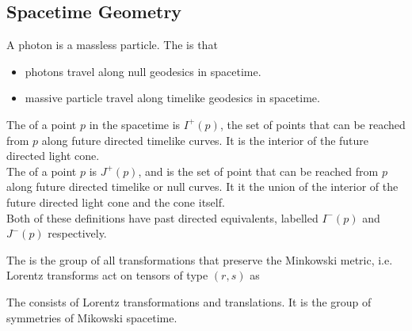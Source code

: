 \documentclass{article}
\begin{document}
\subsection{Spacetime Geometry}

\begin{definition}
A photon is a massless particle. The  is that 
\begin{itemize}
    \item photons travel along null geodesics in spacetime. 
    \item massive particle travel along timelike geodesics in spacetime.
\end{itemize}
\end{definition}

\begin{definition}
The  of a point $p$ in the spacetime is $I^+(p)$, the set of points that can be reached from $p$ along future directed timelike curves. It is the interior of the future directed light cone. \\
The  of a point $p$ is $J^+(p)$, and is the set of point that can be reached from $p$ along future directed timelike or null curves. It it the union of the interior of the future directed light cone and the cone itself. \\
Both of these definitions have past directed equivalents, labelled $I^-(p)$ and $J^-(p)$ respectively. 
\end{definition}

\begin{definition}
The  is the group of all transformations that preserve the Minkowski metric, i.e. 
Lorentz transforms act on tensors of type $(r,s)$ as 
\end{definition}

\begin{definition}
The  consists of Lorentz transformations and translations. It is the group of symmetries of Mikowski spacetime. 
\end{definition}
\end{document}
